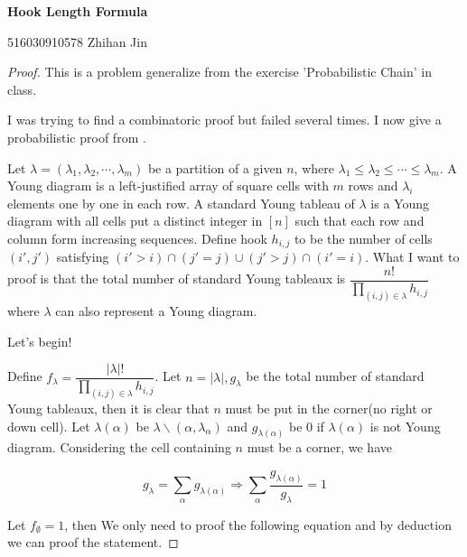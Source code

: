 \documentclass[12pt]{article}
\providecommand{\abs}[1]{\lvert#1\rvert}
\theoremstyle{definition}
\begin{document}
\bigskip

\begin{center}
{\LARGE\bf Hook Length Formula}
\end{center}

\begin{center}
{516030910578 Zhihan Jin}
\end{center}

\bigskip

\begin{proof}
	
	This is a problem generalize from the exercise 'Probabilistic Chain' in class. 
	
	I was trying to find a combinatoric proof but failed several times. I now give a probabilistic proof from \cite{probabilistic}.
	
	Let $\lambda = (\lambda_1, \lambda_2, \cdots, \lambda_m)$ be a partition of a given $n$, where $\lambda_1 \le \lambda_2 \le \cdots \le \lambda_m$. A Young diagram is a left-justified array of square cells with $m$ rows and $\lambda_i$ elements one by one in each row. A standard Young tableau of $\lambda$ is a Young diagram with all cells put a distinct integer in $[n]$ such that each row and column form increasing sequences. Define hook $h_{i, j}$ to be the number of cells $(i', j')$ satisfying $(i' > i) \cap (j' = j) \cup (j' > j) \cap (i' = i)$. What I want to proof is that the total number of standard Young tableaux is $\dfrac{n!}{\prod_{(i,j) \in \lambda}{h_{i,j}}}$ where $\lambda$ can also represent a Young diagram.
	
	Let's begin!
	
	Define $f_\lambda = \dfrac{\abs{\lambda}!}{\prod_{(i,j) \in \lambda}{h_{i,j}}}$. Let $n = \abs{\lambda}, g_\lambda$ be the total number of standard Young tableaux, then it is clear that $n$ must be put in the corner(no right or down cell). Let $\lambda(\alpha)$ be $\lambda \backslash (\alpha, \lambda_\alpha)$ and $g_{\lambda(\alpha)}$ be 0 if $\lambda(\alpha)$ is not Young diagram. Considering the cell containing $n$ must be a corner, we have 
	
	\begin{equation*}
		g_\lambda = \sum\limits_{\alpha}g_{\lambda(\alpha)} \Longrightarrow \sum\limits_{\alpha}\dfrac{g_{\lambda(\alpha)}}{g_{\lambda}} = 1
	\end{equation*}
	
	Let $f_{\emptyset} = 1$, then We only need to proof the following equation and by deduction we can proof the statement.
	

\end{proof}
\end{document}
